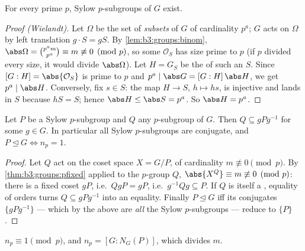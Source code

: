 \begin{theorem}\label{thm:b3:groups:sylow1}
For every prime $p$, Sylow $p$-subgroups of $G$ exist.
\end{theorem}

\begin{proof}[Proof (Wielandt)]
Let $\Omega$ be the set of \emph{subsets} of $G$ of cardinality
$p^a$; $G$ acts on $\Omega$ by left translation $g \cdot S = gS$.
By \cref{lem:b3:groups:binom}, $\abs\Omega = \binom{p^a m}{p^a}
\equiv m \not\equiv 0 \pmod p$, so some  $\mathcal O_S$ has
size prime to $p$ (if $p$ divided every  size, it would divide
$\abs\Omega$). Let $H = G_S$ be the  of such an $S$.
Since $[G : H] = \abs{\mathcal O_S}$ is prime to $p$ and $p^a \mid
\abs G = [G:H]\,\abs H$, we get $p^a \mid \abs H$. Conversely, fix
$s \in S$: the map $H \to S$, $h \mapsto hs$, is injective and
lands in $S$ because $hS = S$; hence $\abs H \leq \abs S = p^a$.
So $\abs H = p^a$.
\end{proof}

\begin{theorem}\label{thm:b3:groups:sylow2}
Let $P$ be a Sylow $p$-subgroup and $Q$ any $p$-subgroup of $G$.
Then $Q \subseteq gPg^{-1}$ for some $g \in G$. In particular all
Sylow $p$-subgroups are conjugate, and $P \trianglelefteq G \iff
n_p = 1$.
\end{theorem}

\begin{proof}
Let $Q$ act on the coset space $X = G/P$, of cardinality $m
\not\equiv 0 \pmod p$. By \cref{thm:b3:groups:pfixed} applied to
the $p$-group $Q$, $\abs{X^Q} \equiv m \not\equiv 0 \pmod p$: there
is a fixed coset $gP$, i.e.\ $QgP = gP$, i.e.\ $g^{-1}Qg \subseteq
P$. If $Q$ is itself a , equality of orders turns
$Q \subseteq gPg^{-1}$ into an equality. Finally $P
\trianglelefteq G$ iff its conjugates $\{gPg^{-1}\}$ --- which by
the above are \emph{all} the Sylow $p$-subgroups --- reduce to
$\{P\}$.
\end{proof}

\begin{theorem}\label{thm:b3:groups:sylow3}
$n_p \equiv 1 \pmod p$, and $n_p = [G : N_G(P)]$, which divides
$m$.
\end{theorem}

